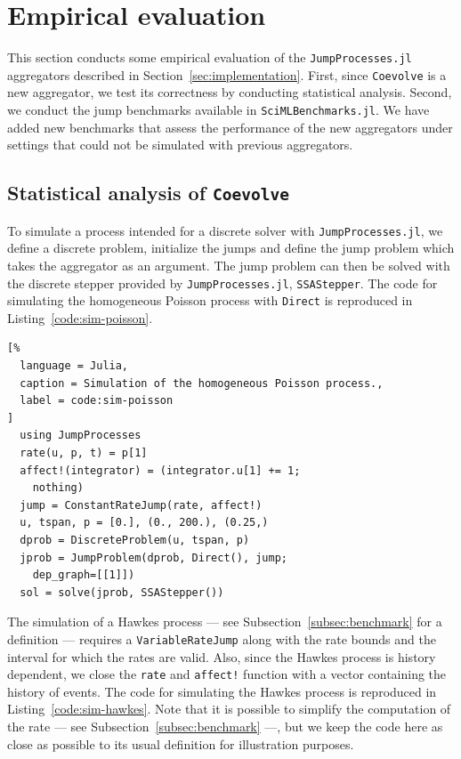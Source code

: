 \documentclass{juliacon}
\numberwithin{equation}{section}
\begin{document}
\section{Empirical evaluation} \label{sec:evaluation}

This section conducts some empirical evaluation of the \texttt{JumpProcesses.jl} aggregators described in Section~\ref{sec:implementation}. First, since \texttt{Coevolve} is a new aggregator, we test its correctness by conducting statistical analysis. Second, we conduct the jump benchmarks available in  \texttt{SciMLBenchmarks.jl}. We have added new benchmarks that assess the performance of the new aggregators under settings that could not be simulated with previous aggregators.

\subsection{Statistical analysis of \texttt{Coevolve}}

To simulate a process intended for a discrete solver with \texttt{JumpProcesses.jl}, we define a discrete problem, initialize the jumps and define the jump problem which takes the aggregator as an argument. The jump problem can then be solved with the discrete stepper provided by \texttt{JumpProcesses.jl}, \texttt{SSAStepper}. The code for simulating the homogeneous Poisson process with \texttt{Direct} is reproduced in Listing~\ref{code:sim-poisson}.

\begin{lstlisting}[%
  language = Julia,
  caption = Simulation of the homogeneous Poisson process.,
  label = code:sim-poisson
]
  using JumpProcesses
  rate(u, p, t) = p[1]
  affect!(integrator) = (integrator.u[1] += 1;
    nothing)
  jump = ConstantRateJump(rate, affect!)
  u, tspan, p = [0.], (0., 200.), (0.25,)
  dprob = DiscreteProblem(u, tspan, p)
  jprob = JumpProblem(dprob, Direct(), jump;
    dep_graph=[[1]])
  sol = solve(jprob, SSAStepper())
\end{lstlisting}

The simulation of a Hawkes process --- see Subsection~\ref{subsec:benchmark} for a definition --- requires a \texttt{VariableRateJump} along with the rate bounds and the interval for which the rates are valid. Also, since the Hawkes process is history dependent, we close the \texttt{rate} and \texttt{affect!} function with a vector containing the history of events. The code for simulating the Hawkes process is reproduced in Listing~\ref{code:sim-hawkes}. Note that it is possible to simplify the computation of the rate --- see Subsection~\ref{subsec:benchmark} ---, but we keep the code here as close as possible to its usual definition for illustration purposes.
\end{document}
